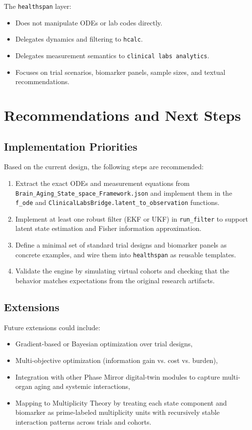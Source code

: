 \documentclass[11pt]{article}
\begin{document}
The \texttt{healthspan} layer:
\begin{itemize}[noitemsep]
  \item Does not manipulate ODEs or lab codes directly.
  \item Delegates dynamics and filtering to \texttt{hcalc}.
  \item Delegates measurement semantics to \texttt{clinical labs analytics}.
  \item Focuses on trial scenarios, biomarker panels, sample sizes, and textual
        recommendations.
\end{itemize}

\section{Recommendations and Next Steps}

\subsection{Implementation Priorities}

Based on the current design, the following steps are recommended:
\begin{enumerate}[noitemsep]
  \item Extract the exact ODEs and measurement equations from
        \texttt{Brain\_Aging\_State\_space\_Framework.json} and implement them in
        the \texttt{f\_ode} and \texttt{ClinicalLabsBridge.latent\_to\_observation}
        functions.
  \item Implement at least one robust filter (EKF or UKF) in \texttt{run\_filter}
        to support latent state estimation and Fisher information approximation.
  \item Define a minimal set of standard trial designs and biomarker panels as
        concrete examples, and wire them into \texttt{healthspan} as reusable
        templates.
  \item Validate the engine by simulating virtual cohorts and checking that the
        behavior matches expectations from the original research artifacts.
\end{enumerate}

\subsection{Extensions}

Future extensions could include:
\begin{itemize}[noitemsep]
  \item Gradient-based or Bayesian optimization over trial designs,
  \item Multi-objective optimization (information gain vs. cost vs. burden),
  \item Integration with other Phase Mirror digital-twin modules to capture
        multi-organ aging and systemic interactions,
  \item Mapping to Multiplicity Theory by treating each state component and
        biomarker as prime-labeled multiplicity units with recursively stable
        interaction patterns across trials and cohorts.
\end{itemize}
\end{document}
